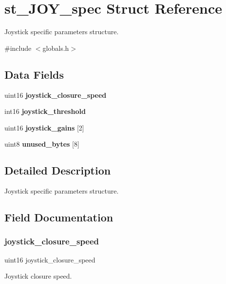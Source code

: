 \section{st\+\_\+\+J\+O\+Y\+\_\+spec Struct Reference}
\label{structst___j_o_y__spec}


Joystick specific parameters structure.  




{\ttfamily \#include $<$globals.\+h$>$}

\subsection*{Data Fields}
\begin{DoxyCompactItemize}
\item 
uint16 \textbf{ joystick\+\_\+closure\+\_\+speed}
\item 
int16 \textbf{ joystick\+\_\+threshold}
\item 
uint16 \textbf{ joystick\+\_\+gains} [2]
\item 
uint8 \textbf{ unused\+\_\+bytes} [8]
\end{DoxyCompactItemize}


\subsection{Detailed Description}
Joystick specific parameters structure. 



\subsection{Field Documentation}
\mbox{\label{structst___j_o_y__spec_a68ab2468a11dbd2be3bced2b612588c0}} 
\subsubsection{joystick\+\_\+closure\+\_\+speed}
{\footnotesize\ttfamily uint16 joystick\+\_\+closure\+\_\+speed}

Joystick closure speed. \mbox{\label{structst___j_o_y__spec_a14cf892a30db1ab3693091b7786f5e7d}} 
